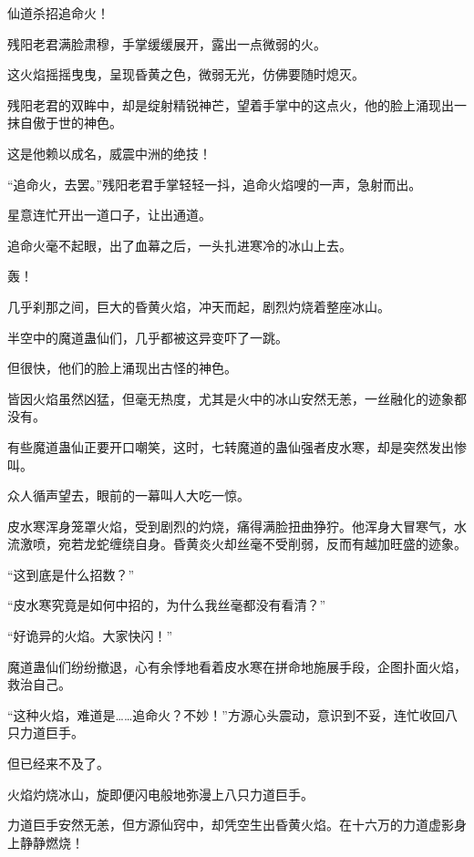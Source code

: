 
\begin{this_body}



仙道杀招追命火！

残阳老君满脸肃穆，手掌缓缓展开，露出一点微弱的火。

这火焰摇摇曳曳，呈现昏黄之色，微弱无光，仿佛要随时熄灭。

残阳老君的双眸中，却是绽射精锐神芒，望着手掌中的这点火，他的脸上涌现出一抹自傲于世的神色。

这是他赖以成名，威震中洲的绝技！

“追命火，去罢。”残阳老君手掌轻轻一抖，追命火焰嗖的一声，急射而出。

星意连忙开出一道口子，让出通道。

追命火毫不起眼，出了血幕之后，一头扎进寒冷的冰山上去。

轰！

几乎刹那之间，巨大的昏黄火焰，冲天而起，剧烈灼烧着整座冰山。

半空中的魔道蛊仙们，几乎都被这异变吓了一跳。

但很快，他们的脸上涌现出古怪的神色。

皆因火焰虽然凶猛，但毫无热度，尤其是火中的冰山安然无恙，一丝融化的迹象都没有。

有些魔道蛊仙正要开口嘲笑，这时，七转魔道的蛊仙强者皮水寒，却是突然发出惨叫。

众人循声望去，眼前的一幕叫人大吃一惊。

皮水寒浑身笼罩火焰，受到剧烈的灼烧，痛得满脸扭曲狰狞。他浑身大冒寒气，水流激喷，宛若龙蛇缠绕自身。昏黄炎火却丝毫不受削弱，反而有越加旺盛的迹象。

“这到底是什么招数？”

“皮水寒究竟是如何中招的，为什么我丝毫都没有看清？”

“好诡异的火焰。大家快闪！”

魔道蛊仙们纷纷撤退，心有余悸地看着皮水寒在拼命地施展手段，企图扑面火焰，救治自己。

“这种火焰，难道是……追命火？不妙！”方源心头震动，意识到不妥，连忙收回八只力道巨手。

但已经来不及了。

火焰灼烧冰山，旋即便闪电般地弥漫上八只力道巨手。

力道巨手安然无恙，但方源仙窍中，却凭空生出昏黄火焰。在十六万的力道虚影身上静静燃烧！


\end{this_body}
